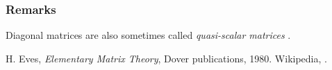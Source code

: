\documentclass[12pt]{article}
\begin{document}
\subsubsection*{Remarks}
Diagonal matrices are also sometimes called \emph{quasi-scalar matrices} \cite{eves}.

\begin{thebibliography}{9}
  H. Eves,
 \emph{Elementary Matrix Theory},
 Dover publications, 1980.
 Wikipedia, 
.
 \end{thebibliography}
\end{document}

